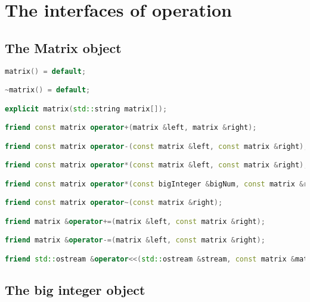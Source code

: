 \documentclass[a4paper]{report}
\begin{document}
\section{The interfaces of operation}
\subsection{The Matrix object}
\begin{lstlisting}[language=C++]
matrix() = default;

~matrix() = default;

explicit matrix(std::string matrix[]);

friend const matrix operator+(matrix &left, matrix &right);

friend const matrix operator-(const matrix &left, const matrix &right);

friend const matrix operator*(const matrix &left, const matrix &right);

friend const matrix operator*(const bigInteger &bigNum, const matrix &right);

friend const matrix operator~(const matrix &right);

friend matrix &operator+=(matrix &left, const matrix &right);

friend matrix &operator-=(matrix &left, const matrix &right);

friend std::ostream &operator<<(std::ostream &stream, const matrix &matrix1);
\end{lstlisting}

\subsection{The big integer object}
\end{document}
